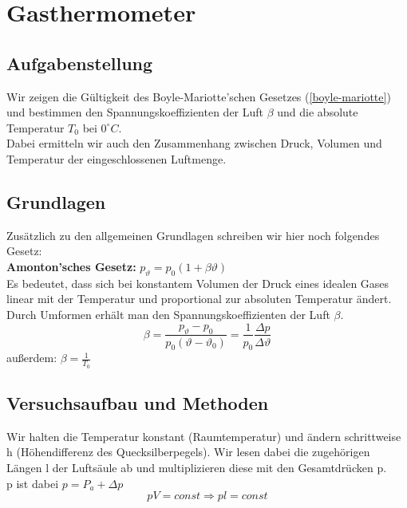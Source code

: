 \documentclass{article}
\begin{document}
\section{Gasthermometer}
\subsection{Aufgabenstellung}
Wir zeigen die Gültigkeit des Boyle-Mariotte'schen Gesetzes (\ref{boyle-mariotte}) und bestimmen den Spannungskoeffizienten der Luft $\beta$ und die absolute Temperatur $T_0$ bei $0^\circ C$.\\
Dabei ermitteln wir auch den Zusammenhang zwischen Druck, Volumen und Temperatur der eingeschlossenen Luftmenge.
\subsection{Grundlagen}
Zusätzlich zu den allgemeinen Grundlagen schreiben wir hier noch folgendes Gesetz:\\
\textbf{Amonton'sches Gesetz:} $p_\vartheta=p_0 (1+\beta\vartheta)$\\
Es bedeutet, dass sich bei konstantem Volumen der Druck eines idealen Gases linear mit der Temperatur und proportional zur absoluten Temperatur ändert. \\
Durch Umformen erhält man den Spannungskoeffizienten der Luft $\beta$.
$$\beta=\frac{p_\vartheta-p_0}{p_0(\vartheta-\vartheta_0)}=\frac{1}{p_0}\frac{\Delta p}{\Delta \vartheta}$$
außerdem: $\beta=\frac{1}{T_0}$
\subsection{Versuchsaufbau und Methoden}
Wir halten die Temperatur konstant (Raumtemperatur) und ändern schrittweise h (Höhendifferenz des Quecksilberpegels). Wir lesen dabei die zugehörigen Längen l der Luftsäule ab und multiplizieren diese mit den Gesamtdrücken p.\\
p ist dabei $p=P_a + \Delta p$
$$pV=const \Rightarrow pl=const$$
\end{document}
